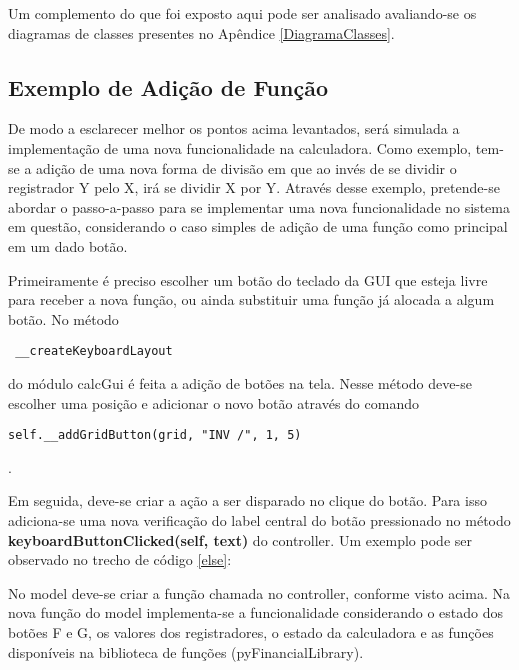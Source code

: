 Um complemento do que foi exposto aqui pode ser analisado avaliando-se os diagramas de classes presentes no Apêndice \ref{DiagramaClasses}.

\subsection{Exemplo de Adição de Função}

De modo a esclarecer melhor os pontos acima levantados, será simulada a implementação de uma nova funcionalidade na calculadora. Como exemplo, tem-se a adição de uma nova forma de divisão em que ao invés de se dividir o registrador Y pelo X, irá se dividir X por Y. 
Através desse exemplo, pretende-se abordar o passo-a-passo para se implementar uma nova funcionalidade no sistema em questão, considerando o caso simples de adição de uma função como principal em um dado botão.

Primeiramente é preciso escolher um botão do teclado da GUI que esteja livre para receber a nova função, ou ainda substituir uma função já alocada a algum botão. No método \begin{verbatim} __createKeyboardLayout \end{verbatim} do módulo calcGui é feita a adição de botões na tela. Nesse método deve-se escolher uma posição e adicionar o novo botão através do comando \begin{verbatim}self.__addGridButton(grid, "INV /", 1, 5)\end{verbatim}.

Em seguida, deve-se criar a ação a ser disparado no clique do botão. Para isso adiciona-se uma nova verificação do label central do botão pressionado no método \textbf{keyboardButtonClicked(self, text)} do controller. Um exemplo pode ser observado no trecho de código \ref{else}: 



No model deve-se criar a função chamada no controller, conforme visto acima. Na nova função do model implementa-se a funcionalidade considerando o estado dos botões 
F e G, os valores dos registradores, o estado da calculadora e as funções disponíveis na biblioteca de funções (pyFinancialLibrary). 

